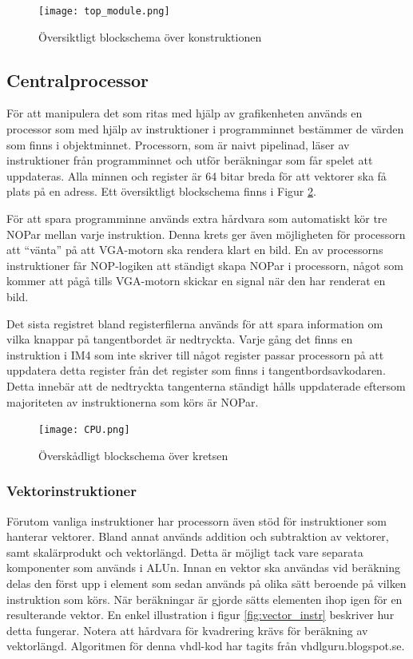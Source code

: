 \documentclass[a4paper]{article}
\begin{document}
    \begin{figure}[H]
        \centering
        \texttt{[image: top\_module.png]}
        \caption{Översiktligt blockschema över  konstruktionen}
        \label{fig:top_module}
    \end{figure}
    
    \subsection{Centralprocessor}
	För att manipulera det som ritas med hjälp av grafikenheten används en processor 
	som med hjälp av instruktioner i programminnet bestämmer de värden som finns i 
	objektminnet. Processorn, som är naivt pipelinad, läser av instruktioner från 
	programminnet och utför beräkningar som får spelet att uppdateras. Alla minnen 
	och register är 64 bitar breda för att vektorer ska få plats på en adress. 
	Ett översiktligt blockschema finns i Figur \ref{fig:cpu}.

	För att spara programminne används extra hårdvara som automatiskt kör tre NOPar 
	mellan varje instruktion. Denna krets ger även möjligheten för processorn att “vänta” 
	på att VGA-motorn ska rendera klart en bild. En av processorns instruktioner får 
	NOP-logiken att ständigt skapa NOPar i processorn, något som kommer att pågå tills 
	VGA-motorn skickar en signal när den har renderat en bild.

	Det sista registret bland registerfilerna används för att spara information om vilka 
	knappar på tangentbordet är nedtryckta. Varje gång det finns en instruktion i IM4 som 
	inte skriver till något register passar processorn på att uppdatera detta register 
	från det register som finns i tangentbordsavkodaren. Detta innebär att de nedtryckta 
	tangenterna ständigt hålls uppdaterade eftersom majoriteten av instruktionerna som körs 
	är NOPar.

	\begin{figure}[H]
        \centering
        \texttt{[image: CPU.png]}
        \caption{Överskådligt blockschema över kretsen}
        \label{fig:cpu}
    \end{figure}
	
	\subsubsection{Vektorinstruktioner}
	Förutom vanliga instruktioner har processorn även stöd för instruktioner som hanterar 
	vektorer. Bland annat används addition och subtraktion av vektorer, samt skalärprodukt 
	och vektorlängd. Detta är möjligt tack vare separata komponenter som används i ALUn. 
	Innan en vektor ska användas vid beräkning delas den först upp i element som sedan används 
	på olika sätt beroende på vilken instruktion som körs. När beräkningar är gjorde sätts 
	elementen ihop igen för en resulterande vektor. En enkel illustration i figur \ref{fig:vector_instr} beskriver 
	hur detta fungerar. Notera att hårdvara för kvadrering krävs för beräkning av vektorlängd. 
	Algoritmen för denna vhdl-kod har tagits från vhdlguru.blogspot.se.
\end{document}
